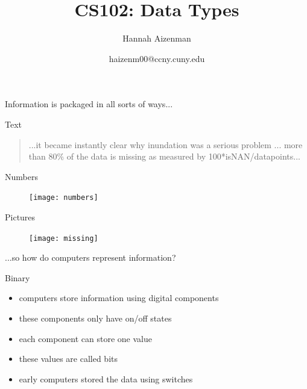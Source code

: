 \documentclass[xcolor={dvipsnames}]{beamer}
\begin{document}
\title{ CS102: Data Types}
\author{Hannah Aizenman}
\date{haizenm00@ccny.cuny.edu}


\begin{frame}
	\titlepage
\end{frame}

\begin{frame}
	\begin{center}
		Information is packaged in all sorts of ways...
	\end{center}
\end{frame}

\begin{frame}{Text}
	\begin{quote}
	 ...it became instantly clear why inundation was a serious problem ... more than 80\% of the data is missing as measured by 100*isNAN/datapoints...
	\end{quote}
\end{frame}

\begin{frame}{Numbers}
	\begin{figure}
			\texttt{[image: numbers]}
	\end{figure}
\end{frame}

\begin{frame}{Pictures}
	\begin{figure}
		\texttt{[image: missing]}
	\end{figure}
\end{frame}

\begin{frame}
	\begin{center}
	...so how do computers represent information?
	\end{center}
\end{frame}

\begin{frame}{Binary}
	\begin{itemize}
		\item computers store information using digital components
		\pause
		\item these components only have on/off states
		\pause
		\item each component can store one value
		\pause
		\item these values are called bits
		\pause
		\item early computers stored the data using switches
	\end{itemize}
\end{frame}
\end{document}
